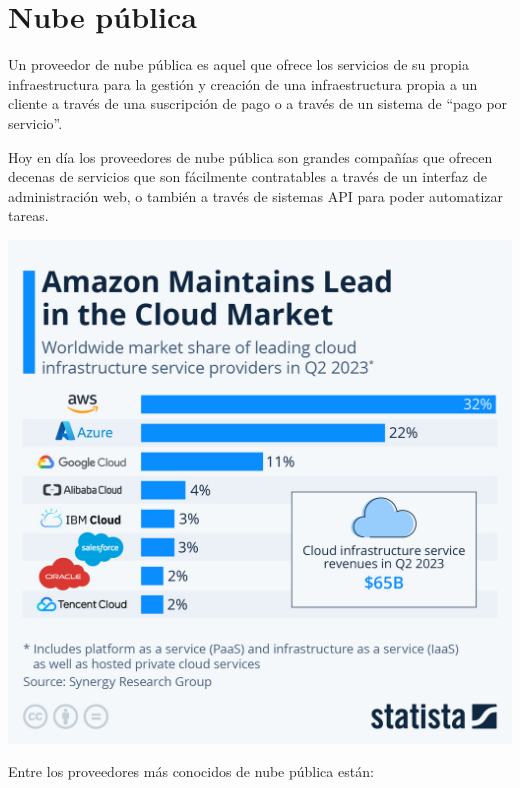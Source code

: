 \section{Nube pública}

Un proveedor de nube pública es aquel que ofrece los servicios de su propia infraestructura para la gestión y creación de una infraestructura propia a un cliente a través de una suscripción de pago o a través de un sistema de “pago por servicio”.

Hoy en día los proveedores de nube pública son grandes compañías que ofrecen decenas de servicios que son fácilmente contratables a través de un interfaz de administración web, o también a través de sistemas API para poder automatizar tareas.

\begin{center}
	\includegraphics[frame,width=0.7\linewidth]{img/aws/stats.jpeg}
\end{center}


Entre los proveedores más conocidos de nube pública están:

